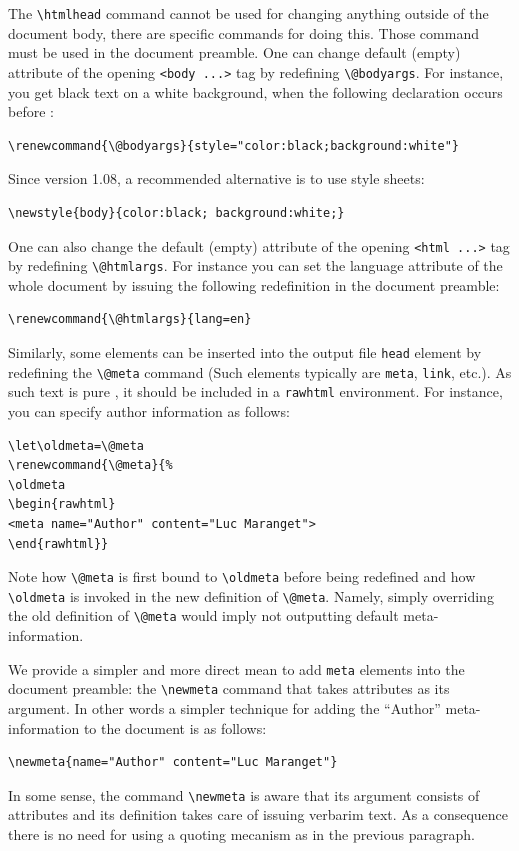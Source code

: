 \label{metadef}
The \verb+\htmlhead+ command cannot be used for changing anything outside of
the \html{} document body, there are specific commands for doing this.
Those command must be used in the document preamble.
One can
change \hevea{} default (empty) attribute of
the opening \verb+<body ...>+ tag by redefining
\verb+\@bodyargs+.
For instance, you get black text on a white background, when the
following declaration occurs before \verb++:
\begin{verbatim}
\renewcommand{\@bodyargs}{style="color:black;background:white"}
\end{verbatim}
Since version 1.08, a recommended alternative is to use style sheets:
\begin{verbatim}
\newstyle{body}{color:black; background:white;}
\end{verbatim}

One can also change the default (empty) attribute of the opening
\verb+<html ...>+ tag by redefining
\verb+\@htmlargs+. For instance you can set the language attribute
of the whole document by issuing the following redefinition in
the document preamble:
\begin{verbatim}
\renewcommand{\@htmlargs}{lang=en}
\end{verbatim}

\label{exlet}Similarly, some elements can be inserted into the output file
\verb+head+ element by redefining the \verb+\@meta+ command
(Such elements typically are \verb+meta+, \verb+link+, etc.).
As such text is pure \html{}, it should be included in a
\verb+rawhtml+ environment. For instance, you can specify
author information as follows:
\begin{verbatim}
\let\oldmeta=\@meta
\renewcommand{\@meta}{%
\oldmeta
\begin{rawhtml}
<meta name="Author" content="Luc Maranget">
\end{rawhtml}}
\end{verbatim}
Note how \verb+\@meta+ is first bound to
\verb+\oldmeta+ before being redefined and how \verb+\oldmeta+ is
invoked in the new definition of \verb+\@meta+.
Namely, simply overriding the old definition of \verb+\@meta+ would
imply not outputting default meta-information.

We provide a simpler and more direct mean to add \verb+meta+ elements into
the \html{} document preamble: the \verb+\newmeta+ command that
takes attributes as its argument. In other words a simpler technique for adding the ``Author''  meta-information to the document is as follows:
\begin{verbatim}
\newmeta{name="Author" content="Luc Maranget"}
\end{verbatim}
In some sense, the command  \verb+\newmeta+ is aware that its argument
consists of attributes and its definition takes care of issuing verbarim text.
As a consequence there is no need for using a quoting mecanism as in the
previous paragraph.


